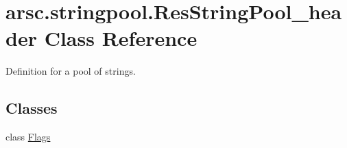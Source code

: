 \hypertarget{classarsc_1_1stringpool_1_1ResStringPool__header}{}\section{arsc.\+stringpool.\+Res\+String\+Pool\+\_\+header Class Reference}
\label{classarsc_1_1stringpool_1_1ResStringPool__header}


Definition for a pool of strings.  


\subsection*{Classes}
\begin{DoxyCompactItemize}
\item 
class \mbox{\hyperlink{classarsc_1_1stringpool_1_1ResStringPool__header_1_1Flags}{Flags}}
\end{DoxyCompactItemize}
